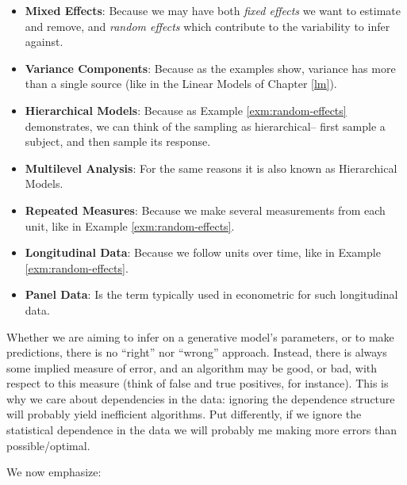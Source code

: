 \documentclass[]{book}
\theoremstyle{definition}
\theoremstyle{definition}
\theoremstyle{definition}
\theoremstyle{remark}
\begin{document}
\begin{itemize}
\item
  \textbf{Mixed Effects}:
  Because we may have both \emph{fixed effects} we want to estimate and remove, and \emph{random effects} which contribute to the variability to infer against.
\item
  \textbf{Variance Components}:
  Because as the examples show, variance has more than a single source (like in the Linear Models of Chapter \ref{lm}).
\item
  \textbf{Hierarchical Models}:
  Because as Example \ref{exm:random-effects} demonstrates, we can think of the sampling as hierarchical-- first sample a subject, and then sample its response.
\item
  \textbf{Multilevel Analysis}:
  For the same reasons it is also known as Hierarchical Models.
\item
  \textbf{Repeated Measures}:
  Because we make several measurements from each unit, like in Example \ref{exm:random-effects}.
\item
  \textbf{Longitudinal Data}:
  Because we follow units over time, like in Example \ref{exm:random-effects}.
\item
  \textbf{Panel Data}:
  Is the term typically used in econometric for such longitudinal data.
\end{itemize}

Whether we are aiming to infer on a generative model's parameters, or to make predictions, there is no ``right'' nor ``wrong'' approach. Instead, there is always some implied measure of error, and an algorithm may be good, or bad, with respect to this measure (think of false and true positives, for instance).
This is why we care about dependencies in the data: ignoring the dependence structure will probably yield inefficient algorithms.
Put differently, if we ignore the statistical dependence in the data we will probably me making more errors than possible/optimal.

We now emphasize:
\end{document}
